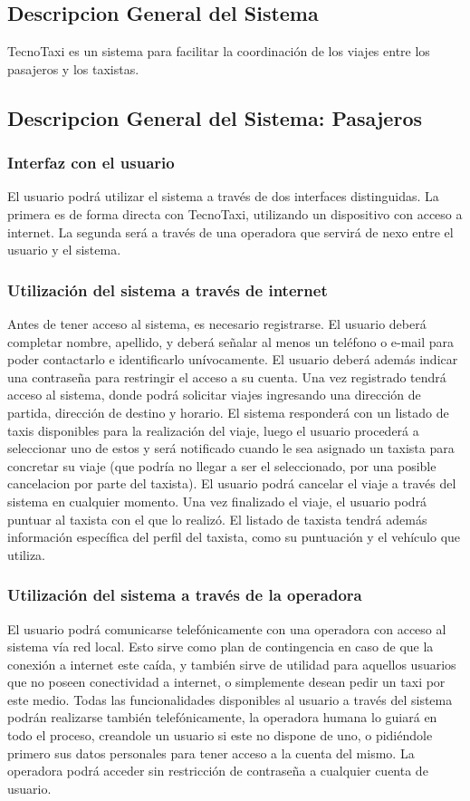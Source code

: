 \subsection{Descripcion General del Sistema}
TecnoTaxi es un sistema para facilitar la coordinación de los viajes entre los pasajeros y los taxistas.
\subsection{Descripcion General del Sistema: Pasajeros}
	\subsubsection{Interfaz con el usuario}
	El usuario podrá utilizar el sistema a través de dos interfaces distinguidas. La primera es de forma directa con TecnoTaxi, utilizando un dispositivo con acceso a internet. La segunda será a través de una operadora que servirá de nexo entre el usuario y el sistema.

	\subsubsection{Utilización del sistema a través de internet}
	Antes de tener acceso al sistema, es necesario registrarse. El usuario deberá completar nombre, apellido, y deberá señalar al menos un teléfono o e-mail para poder contactarlo e identificarlo unívocamente. El usuario deberá además indicar una contraseña para restringir el acceso a su cuenta. Una vez registrado tendrá acceso al sistema, donde podrá solicitar viajes ingresando una dirección de partida, dirección de destino y horario. El sistema responderá con un listado de taxis disponibles para la realización del viaje, luego el usuario procederá a seleccionar uno de estos y será notificado cuando le sea asignado un taxista para concretar su viaje (que podría no llegar a ser el seleccionado, por una posible cancelacion por parte del taxista). El usuario podrá cancelar el viaje a través del sistema en cualquier momento. Una vez finalizado el viaje, el usuario podrá puntuar al taxista con el que lo realizó. El listado de taxista tendrá además información específica del perfil del taxista, como su puntuación y el vehículo que utiliza.

	\subsubsection{Utilización del sistema a través de la operadora}
	El usuario podrá comunicarse telefónicamente con una operadora con acceso al sistema vía red local. Esto sirve como plan de contingencia en caso de que la conexión a internet este caída, y también sirve de utilidad para aquellos usuarios que no poseen conectividad a internet, o simplemente desean pedir un taxi por este medio. Todas las funcionalidades disponibles al usuario a través del sistema podrán realizarse también telefónicamente, la operadora humana lo guiará en todo el proceso, creandole un usuario si este no dispone de uno, o pidiéndole primero sus datos personales para tener acceso a la cuenta del mismo. La operadora podrá acceder sin restricción de contraseña a cualquier cuenta de usuario.

